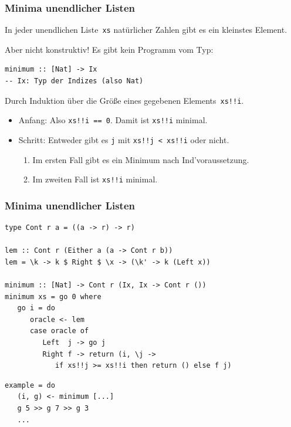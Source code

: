 \documentclass[12pt,utf8,notheorems,compress,t]{beamer}
\renewcommand{\_}{\mathpunct{.}}
\newcommand{\?}{\,{:}\,}
\newcommand{\hil}[1]{{\usebeamercolor[fg]{item}{\textbf{#1}}}}
\begin{document}
\begin{frame}[fragile]\frametitle{Minima unendlicher Listen}
  \hil{Satz.} In jeder unendlichen Liste~\texttt{xs} natürlicher Zahlen gibt es
  ein kleinstes Element.

  Aber nicht konstruktiv! Es gibt kein Programm vom Typ:
  \begin{center}
    \begin{minipage}{0.65\textwidth}
      \begin{verbatim}
minimum :: [Nat] -> Ix
-- Ix: Typ der Indizes (also Nat)
      \end{verbatim}
    \end{minipage}
  \end{center}

  \pause
  \hil{Beweis.} Durch Induktion über die Größe eines gegebenen
  Elements~\texttt{xs!!i}.
  \begin{itemize}
    \item Anfang: Also \texttt{xs!!i == 0}. Damit ist \texttt{xs!!i}
    minimal.
    \item Schritt: Entweder gibt es \texttt{j} mit \texttt{xs!!j < xs!!i} oder nicht.
    \begin{enumerate}
      \item Im ersten Fall gibt es ein Minimum nach Ind'voraussetzung.
      \item Im zweiten Fall ist \texttt{xs!!i} minimal.
    \end{enumerate}
  \end{itemize}
\end{frame}

\begin{frame}[fragile]\frametitle{Minima unendlicher Listen}
  \begin{verbatim}
type Cont r a = ((a -> r) -> r)

lem :: Cont r (Either a (a -> Cont r b))
lem = \k -> k $ Right $ \x -> (\k' -> k (Left x))

minimum :: [Nat] -> Cont r (Ix, Ix -> Cont r ())
minimum xs = go 0 where
   go i = do
      oracle <- lem
      case oracle of
         Left  j -> go j
         Right f -> return (i, \j ->
            if xs!!j >= xs!!i then return () else f j)
  \end{verbatim}
  \pause
  \begin{verbatim}
example = do
   (i, g) <- minimum [...]
   g 5 >> g 7 >> g 3
   ...
  \end{verbatim}
\end{frame}
\end{document}
